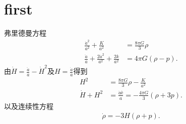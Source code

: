 \documentclass{article}
\begin{document}
\section{first}
  弗里德曼方程
  \begin{align}
    \frac{\dot{a}^2}{a^2}+\frac{K}{a^2} &=\frac{8\pi G}{3}\rho \\
    \frac{\ddot{a}}{a}+\frac{2\dot{a}^2}{a^2}+\frac{2k}{a^2}&=4\pi
    G{\left(\rho-p\right)}.
  \end{align}
  由$\dot{H}=\frac{\ddot{a}}{a}-\dot{H}^2$及$H=\frac{\dot{a}}{a}$得到
  \begin{align}
    \label{eq:friedmann-equation}
    H^2 &=\frac{8\pi G}{3}\rho -\frac{K}{a^2} \\
    \label{eq:accelaration-equation}
    \dot{H}+H^2 &= \frac{\ddot{a}è}{a}=-\frac{4\pi
    G}{3}{\left(\rho+3p\right)}.
  \end{align}
  以及连续性方程
  \begin{align}
    \label{eq:continuation-equation}
    \dot{\rho}=-3H{\left(\rho+p\right)}.
  \end{align}
\end{document}
